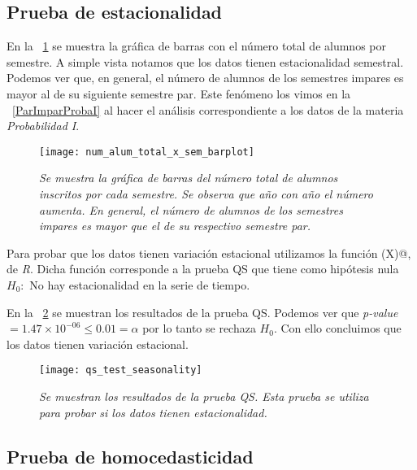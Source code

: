 \subsection{Prueba de estacionalidad}

En la \figurename{~\ref{TotalAlumBarras}} se muestra la gráfica de barras con el número total de alumnos por semestre. A simple vista notamos que los datos tienen estacionalidad semestral. Podemos ver que, en general, el número de alumnos de los semestres impares es mayor al de su siguiente semestre par. Este fenómeno los vimos en la \figurename{~\ref{ParImparProbaI}} al hacer el análisis correspondiente a los datos de la materia \textit{Probabilidad I}.

\begin{figure}[h]
\centering
\texttt{[image: num\_alum\_total\_x\_sem\_barplot]} %
\caption[\textit{Número total de alumnos por semestre}]{\textit{Se muestra la gráfica de barras del número total de alumnos inscritos por cada semestre. Se observa que año con año el número aumenta. En general, el número de alumnos de los semestres impares es mayor que el de su respectivo semestre par.}}\label{TotalAlumBarras}
\end{figure}


Para probar que los datos tienen variación estacional utilizamos la función \verb@qs(X)@, de \textit{R}. Dicha función corresponde a la prueba QS que tiene como hipótesis nula $H_{0}:$ No hay estacionalidad en la serie de tiempo.

En la \figurename{~\ref{QS_testSeasonality}} se muestran los resultados de la prueba QS. Podemos ver que \textit{p-value} $ = 1.47 \times 10^{-06} \leqslant 0.01 = \alpha$ por lo tanto se rechaza $H_{0}$. Con ello concluimos que los datos tienen variación estacional.

\begin{figure}[H]
\centering
\texttt{[image: qs\_test\_seasonality]} %
\caption[\textit{Prueba QS para estacionalidad}]{\textit{Se muestran los resultados de la prueba QS. Esta prueba se utiliza para probar si los datos tienen estacionalidad.}}\label{QS_testSeasonality}
\end{figure}


\subsection{Prueba de homocedasticidad}

